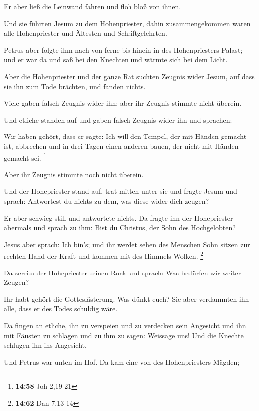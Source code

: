  Er aber ließ die Leinwand fahren und floh bloß von ihnen.

 Und sie führten Jesum zu dem Hohenpriester, dahin
zusammengekommen waren alle Hohenpriester und Ältesten und
Schriftgelehrten.

 Petrus aber folgte ihm nach von ferne bis hinein in des
Hohenpriesters Palast; und er war da und saß bei den Knechten und wärmte
sich bei dem Licht.

 Aber die Hohenpriester und der ganze Rat suchten Zeugnis
wider Jesum, auf dass sie ihn zum Tode brächten, und fanden nichts.

 Viele gaben falsch Zeugnis wider ihn; aber ihr Zeugnis
stimmte nicht überein.

 Und etliche standen auf und gaben falsch Zeugnis wider ihn
und sprachen:

 Wir haben gehört, dass er sagte: Ich will den Tempel, der
mit Händen gemacht ist, abbrechen und in drei Tagen einen anderen bauen,
der nicht mit Händen gemacht sei. \footnote{\textbf{14:58} Joh 2,19-21}

 Aber ihr Zeugnis stimmte noch nicht überein.

 Und der Hohepriester stand auf, trat mitten unter sie und
fragte Jesum und sprach: Antwortest du nichts zu dem, was diese wider
dich zeugen?

 Er aber schwieg still und antwortete nichts. Da fragte ihn
der Hohepriester abermals und sprach zu ihm: Bist du Christus, der Sohn
des Hochgelobten?

 Jesus aber sprach: Ich bin's; und ihr werdet sehen des
Menschen Sohn sitzen zur rechten Hand der Kraft und kommen mit des
Himmels Wolken. \footnote{\textbf{14:62} Dan 7,13-14}

 Da zerriss der Hohepriester seinen Rock und sprach: Was
bedürfen wir weiter Zeugen?

 Ihr habt gehört die Gotteslästerung. Was dünkt euch? Sie
aber verdammten ihn alle, dass er des Todes schuldig wäre.

 Da fingen an etliche, ihn zu verspeien und zu verdecken
sein Angesicht und ihn mit Fäusten zu schlagen und zu ihm zu sagen:
Weissage uns! Und die Knechte schlugen ihn ins Angesicht.

 Und Petrus war unten im Hof. Da kam eine von des
Hohenpriesters Mägden;

